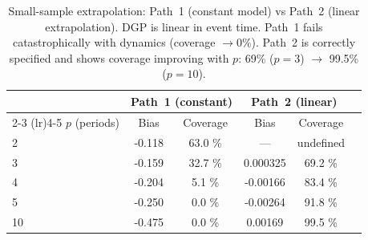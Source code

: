 \begin{table}[htbp]
\centering
\caption{Small-sample extrapolation: Path~1 (constant model) vs Path~2 (linear extrapolation).
DGP is linear in event time. Path~1 fails catastrophically with dynamics (coverage \(\to 0\%\)).
Path~2 is correctly specified and shows coverage improving with \(p\): 69\% (\(p=3\)) \(\to\) 99.5\% (\(p=10\)).}
\label{tab:section8_3_combined}
\begin{tabular}{lccccc}
\toprule
& \multicolumn{2}{c}{Path~1 (constant)} & \multicolumn{2}{c}{Path~2 (linear)} \\
\cmidrule(lr){2-3} \cmidrule(lr){4-5}
\(p\) (periods) & Bias & Coverage & Bias & Coverage \\
\midrule
2 &
-0.118
 &
63.0
\% & --- & undefined \\
3 &
-0.159
 &
32.7
\% &
0.000325
 &
69.2
\% \\
4 &
-0.204
 &
5.1
\% &
-0.00166
 &
83.4
\% \\
5 &
-0.250
 &
0.0
\% &
-0.00264
 &
91.8
\% \\
10 &
-0.475
 &
0.0
\% &
0.00169
 &
99.5
\% \\
\bottomrule
\end{tabular}
\end{table}

